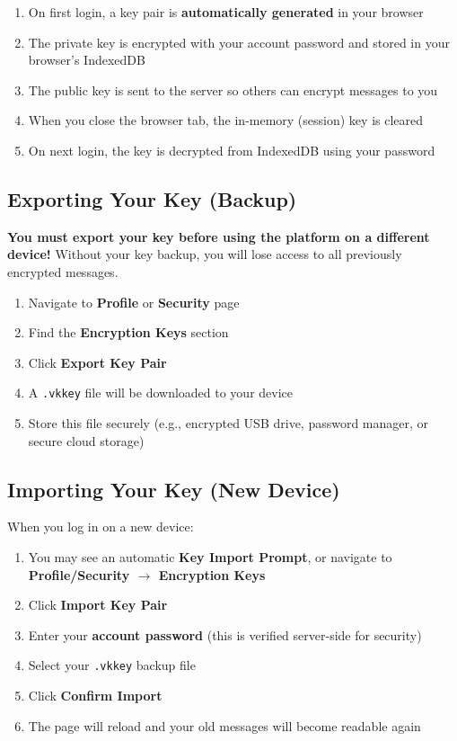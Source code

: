 \documentclass[12pt,a4paper]{article}
\begin{document}
\begin{enumerate}
  \item On first login, a key pair is \textbf{automatically generated} in your browser
  \item The private key is encrypted with your account password and stored in your browser's IndexedDB
  \item The public key is sent to the server so others can encrypt messages to you
  \item When you close the browser tab, the in-memory (session) key is cleared
  \item On next login, the key is decrypted from IndexedDB using your password
\end{enumerate}

\subsection{Exporting Your Key (Backup)}

\begin{dangerbox}
\textbf{You must export your key before using the platform on a different device!} Without your key backup, you will lose access to all previously encrypted messages.
\end{dangerbox}

\begin{enumerate}
  \item Navigate to \textbf{Profile} or \textbf{Security} page
  \item Find the \textbf{Encryption Keys} section
  \item Click \textbf{Export Key Pair}
  \item A \texttt{.vkkey} file will be downloaded to your device
  \item Store this file securely (e.g., encrypted USB drive, password manager, or secure cloud storage)
\end{enumerate}

\subsection{Importing Your Key (New Device)}

When you log in on a new device:

\begin{enumerate}
  \item You may see an automatic \textbf{Key Import Prompt}, or navigate to \textbf{Profile/Security $\rightarrow$ Encryption Keys}
  \item Click \textbf{Import Key Pair}
  \item Enter your \textbf{account password} (this is verified server-side for security)
  \item Select your \texttt{.vkkey} backup file
  \item Click \textbf{Confirm Import}
  \item The page will reload and your old messages will become readable again
\end{enumerate}
\end{document}
